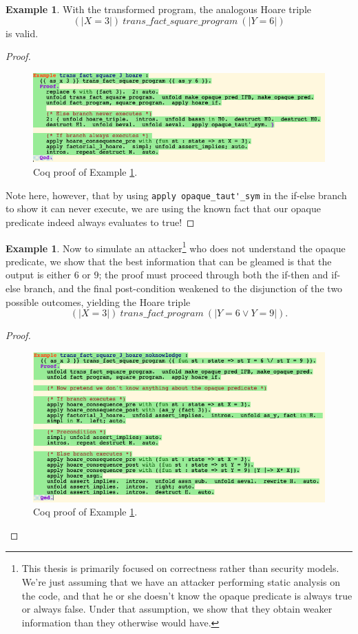 \documentclass[12pt,notitlepage]{report}
\theoremstyle{plain}
\theoremstyle{definition}
\newtheorem{example}[theo]{Example}
\numberwithin{equation}{section}
\begin{document}
\begin{example}\label{hoare22}
With the transformed program, the analogous Hoare triple
\[(|X=3|)\ trans\_fact\_square\_program\ (|Y=6|)\]
is valid.
\begin{proof}
\noindent\begin{figure}[H]
        \centering
        \includegraphics[scale=0.6]{hoare22}
        \caption{Coq proof of Example \ref{hoare22}.}
        \label{fig:hoare22}
        \end{figure}
Note here, however, that by using \verb$apply opaque_taut'_sym$ in the if-else branch to show it can never execute, we are using the known fact that our opaque predicate indeed always evaluates to true!
\end{proof}
\end{example}

\begin{example}\label{hoare23}
Now to simulate an attacker\footnote{This thesis is primarily focused on correctness rather than security models.  We're just assuming that we have an attacker performing static analysis on the code, and that he or she doesn't know the opaque predicate is always true or always false.  Under that assumption, we show that they obtain weaker information than they otherwise would have.} who does not understand the opaque predicate, we show that the best information that can be gleamed is that the output is either $6$ or $9$; the proof must proceed through both the if-then and if-else branch, and the final post-condition weakened to the disjunction of the two possible outcomes, yielding the Hoare triple
\[
(|X=3|)\ trans\_fact\_program\ (|Y=6 \lor Y=9|).
\]
\begin{proof}
\noindent\begin{figure}[H]
        \centering
        \includegraphics[scale=0.6]{hoare23}
        \caption{Coq proof of Example \ref{hoare23}.}
        \label{fig:hoare23}
        \end{figure}
\end{proof}
\end{example}
\end{document}
